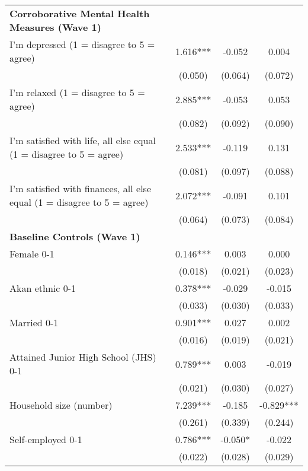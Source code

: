 \begin{ThreePartTable}
\begin{table}[tbp]
\begin{tabular}{lccc}
\textbf{Corroborative Mental Health Measures (Wave 1)} & & & \\ 
 I'm depressed (1 = disagree to 5 = agree) & 1.616*** & -0.052 & 0.004 \\ [0.1em] 
                   &      (0.050)     &      (0.064)     &      (0.072)     \\ [0.1em] 
 I'm relaxed (1 = disagree to 5 = agree) & 2.885*** & -0.053 & 0.053 \\ [0.1em] 
                   &      (0.082)     &      (0.092)     &      (0.090)     \\ [0.1em] 
 I'm satisfied with life, all else equal (1 = disagree to 5 = agree) & 2.533*** & -0.119 & 0.131 \\ [0.1em] 
                   &      (0.081)     &      (0.097)     &      (0.088)     \\ [0.1em] 
 I'm satisfied with finances, all else equal (1 = disagree to 5 = agree) & 2.072*** & -0.091 & 0.101 \\ [0.1em] 
                   &      (0.064)     &      (0.073)     &      (0.084)     \\ [0.1em] 
\textbf{Baseline Controls (Wave 1)} & & & \\ 
 Female 0-1 & 0.146*** & 0.003 & 0.000 \\ [0.1em] 
                   &      (0.018)     &      (0.021)     &      (0.023)     \\ [0.1em] 
 Akan ethnic 0-1 & 0.378*** & -0.029 & -0.015 \\ [0.1em] 
                   &      (0.033)     &      (0.030)     &      (0.033)     \\ [0.1em] 
 Married 0-1 & 0.901*** & 0.027 & 0.002 \\ [0.1em] 
                   &      (0.016)     &      (0.019)     &      (0.021)     \\ [0.1em] 
 Attained Junior High School (JHS) 0-1 & 0.789*** & 0.003 & -0.019 \\ [0.1em] 
                   &      (0.021)     &      (0.030)     &      (0.027)     \\ [0.1em] 
 Household size (number) & 7.239*** & -0.185 & -0.829*** \\ [0.1em] 
                   &      (0.261)     &      (0.339)     &      (0.244)     \\ [0.1em] 
 Self-employed 0-1 & 0.786*** & -0.050* & -0.022 \\ [0.1em] 
                   &      (0.022)     &      (0.028)     &      (0.029)     \\ [0.1em] 

\end{tabular}
\end{table}
\end{ThreePartTable}

